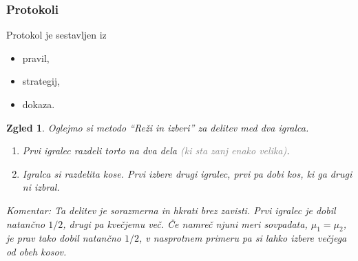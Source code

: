 \documentclass{beamer}
\newtheorem{zgled}{Zgled}
\begin{document}
\begin{frame}

\frametitle{Protokoli}

Protokol je sestavljen iz

\begin{itemize}
\item pravil,
\item strategij,
\item dokaza.
\end{itemize}

\begin{zgled}

Oglejmo si metodo ``Reži in izberi'' za delitev med dva igralca.
\begin{enumerate}

\item Prvi igralec razdeli torto na dva dela \textcolor{gray}{(ki sta zanj enako velika)}.

\item Igralca si razdelita kose. Prvi izbere drugi igralec, prvi pa dobi kos, ki ga drugi ni izbral.

\end{enumerate}

{\em Komentar:} Ta delitev je {\em sorazmerna\/} in hkrati {\em brez zavisti\/}. Prvi igralec je dobil natančno $1/2$, drugi pa kvečjemu več. Če namreč njuni meri sovpadata, $\mu_1 = \mu_2$, je prav tako dobil natančno $1/2$, v nasprotnem primeru pa si lahko izbere večjega od obeh kosov.


\end{zgled}

\end{frame}
\end{document}
